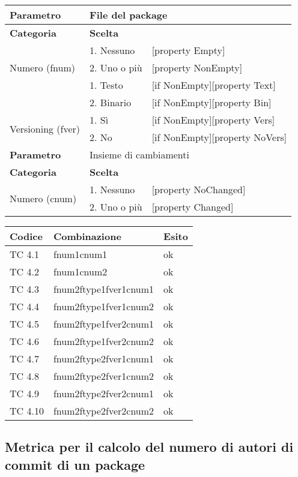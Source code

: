 \begin{tabular}{|p{4cm}|p{4cm}p{5cm}|}
	\hline
	\cellcolor{Gray} \textbf{Parametro}				& \multicolumn{2}{l|}{File del package}							\tabularnewline
	\hline
	\rowcolor{Gray}
	\textbf{Categoria}						& \textbf{Scelta}			&						\tabularnewline
	\hline
	\multirow{3}{*}{Numero (fnum)}					& 1. Nessuno				&	[property Empty] 			\tabularnewline
									\cline{2-3}
									& 2. Uno o più				&	[property NonEmpty]			\tabularnewline
	\hline
	\multirow{2}{*}{Tipo (ftype)}					& 1. Testo				&	[if NonEmpty][property Text] 		\tabularnewline
									\cline{2-3}
									& 2. Binario				&	[if NonEmpty][property Bin]		\tabularnewline
	\hline
	\multirow{2}{*}{Versioning (fver)}				& 1. Sì					&	[if NonEmpty][property Vers] 		\tabularnewline
									\cline{2-3}
									& 2. No					&	[if NonEmpty][property NoVers]		\tabularnewline
	\hline
	
	\cellcolor{Gray} \textbf{Parametro}				& \multicolumn{2}{l|}{Insieme di cambiamenti}						\tabularnewline
	\hline
	\rowcolor{Gray}
	\textbf{Categoria}						& \textbf{Scelta}			&						\tabularnewline
	\hline
	\multirow{3}{*}{Numero (cnum)}					& 1. Nessuno				&	[property NoChanged] 			\tabularnewline
									\cline{2-3}
									& 2. Uno o più				&	[property Changed]			\tabularnewline

	\hline
\end{tabular}

\vspace{1cm}

\begin{tabular}{|p{3cm}|p{7cm}|p{3cm}|}
	\hline
	\rowcolor{Gray}
	\textbf{Codice} & \textbf{Combinazione} & \textbf{Esito}\tabularnewline
	\hline
	TC 4.1			& fnum1cnum1			& ok \tabularnewline
	\hline
	TC 4.2			& fnum1cnum2			& ok \tabularnewline
	\hline
	TC 4.3			& fnum2ftype1fver1cnum1		& ok \tabularnewline
	\hline
	TC 4.4			& fnum2ftype1fver1cnum2		& ok \tabularnewline
	\hline
	TC 4.5			& fnum2ftype1fver2cnum1		& ok \tabularnewline
	\hline
	TC 4.6			& fnum2ftype1fver2cnum2		& ok \tabularnewline
	\hline
	TC 4.7			& fnum2ftype2fver1cnum1		& ok \tabularnewline
	\hline
	TC 4.8			& fnum2ftype2fver1cnum2		& ok \tabularnewline
	\hline
	TC 4.9			& fnum2ftype2fver2cnum1		& ok \tabularnewline
	\hline
	TC 4.10			&fnum2ftype2fver2cnum2		& ok \tabularnewline
	\hline
\end{tabular}
\clearpage




\subsection{Metrica per il calcolo del numero di autori di commit di un package}

